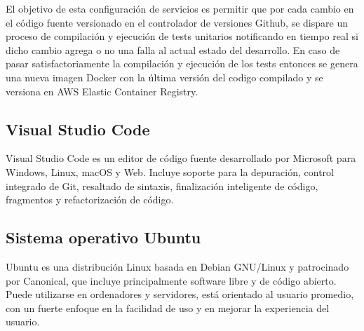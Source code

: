 El objetivo de esta configuración de servicios es permitir que por cada cambio en el código fuente versionado en el controlador de versiones Github, se dispare un proceso de compilación y ejecución de tests unitarios notificando en tiempo real si dicho cambio agrega o no una falla al actual estado del desarrollo. En caso de pasar satisfactoriamente la compilación y ejecución de los tests entonces se genera una nueva imagen Docker con la última versión del codigo compilado y se versiona en AWS Elastic Container Registry.

\subsection{Visual Studio Code}

Visual Studio Code \cite{vscode_website} es un editor de código fuente desarrollado por Microsoft para Windows, Linux, macOS y Web. Incluye soporte para la depuración, control integrado de Git, resaltado de sintaxis, finalización inteligente de código, fragmentos y refactorización de código.


\subsection{Sistema operativo Ubuntu}
Ubuntu \cite{ubuntu_website} es una distribución Linux basada en Debian GNU/Linux y patrocinado por Canonical, que incluye principalmente software libre y de código abierto. Puede utilizarse en ordenadores y servidores, está orientado al usuario promedio, con un fuerte enfoque en la facilidad de uso y en mejorar la experiencia del usuario.




